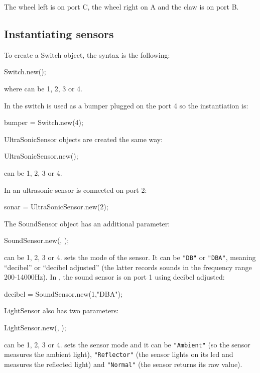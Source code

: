 The wheel left is on port C, the wheel right on A and the claw is on port B.

\subsection{Instantiating sensors}
To create a Switch object, the syntax is the following:
\begin{urbiunchecked}
Switch.new();
\end{urbiunchecked}
\noindent
where  can be 1, 2, 3 or 4.

In  the switch is used as a bumper plugged on the port 4 so
the instantiation is:
\begin{urbiunchecked}
bumper  = Switch.new(4);
\end{urbiunchecked}

UltraSonicSensor objects are created the same way:
\begin{urbiunchecked}
UltraSonicSensor.new();
\end{urbiunchecked}

 can be 1, 2, 3 or 4.

In  an ultrasonic sensor is connected on port 2:
\begin{urbiunchecked}
sonar = UltraSonicSensor.new(2);
\end{urbiunchecked}

The SoundSensor object has an additional parameter:
\begin{urbiunchecked}
SoundSensor.new(, );
\end{urbiunchecked}

 can be 1, 2, 3 or 4.   sets the mode of the sensor. It
can be \lstinline{"DB"} or \lstinline{"DBA"}, meaning ``decibel'' or
``decibel adjusted'' (the latter records sounds in the frequency range
200-14000Hz).  In , the sound sensor is on port 1 using
decibel adjusted:
\begin{urbiunchecked}
decibel = SoundSensor.new(1,"DBA");
\end{urbiunchecked}

LightSensor also has two parameters:
\begin{urbiunchecked}
LightSensor.new(, );
\end{urbiunchecked}

 can be 1, 2, 3 or 4.  sets the sensor mode and it can
be \lstinline{"Ambient"} (so the sensor measures the ambient light),
\lstinline{"Reflector"} (the sensor lights on its led and measures the
reflected light) and \lstinline{"Normal"} (the sensor returns its raw
value).

